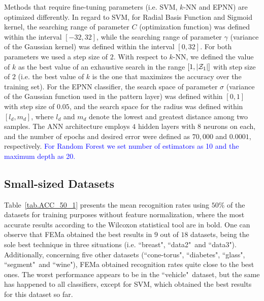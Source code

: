 Methods that require fine-tuning parameters (i.e. SVM, $k$-NN and EPNN) are optimized differently. In regard to SVM, for Radial Basis Function and Sigmoid kernel, the searching range of parameter $C$ (optimization function) was defined within the interval $[-32, 32]$, while the searching range of parameter $\gamma$ (variance of the Gaussian kernel) was defined within the interval $[0, 32]$. For both parameters we used a step size of $2$. With respect to $k$-NN, we defined the value of $k$ as the best value of an exhaustive search in the range $[1,|{\cal{Z}}_{1}|]$ with step size of $2$ (i.e. the best value of $k$ is the one that maximizes the accuracy over the training set). For the EPNN classifier, the search space of parameter $\sigma$ (variance of the Gaussian function used in the pattern layer) was defined within $[0,1]$ with step size of $0.05$, and the search space for the radius was defined within $[l_d,m_d]$, where $l_d$ and $m_d$ denote the lowest and greatest distance among two samples. The ANN architecture employs $4$ hidden layers with $8$ neurons on each, and the number of epochs and desired error were defined as $70,000$ and $0.0001$, respectively. \textcolor{blue}{For Random Forest we set number of estimators as 10 and the maximum depth as 20.} 

\subsection{Small-sized Datasets}
\label{ss.small}


Table~\ref{tab.ACC_50_1} presents the mean recognition rates using $50\%$ of the datasets for training purposes without feature normalization, where the most accurate results according to the Wilcoxon statistical tool are in bold. One can observe that FEMa obtained the best results in $9$ out of $18$ datasets, being the sole best technique in three situations (i.e. ``breast", ``data2"\ and ``data3"). Additionally, concerning five other datasets (``cone-torus", ``diabetes", ``glass", ``segment"\ and ``wine"), FEMa obtained recognition rates quite close to the best ones. The worst performance appears to be in the ``vehicle"\ dataset, but the same has happened to all classifiers, except for SVM, which obtained the best results for this dataset so far.

